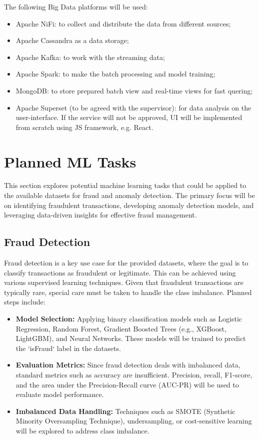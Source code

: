 \documentclass[12pt,a4paper, hidelinks]{article}
\begin{document}
The following Big Data platforms will be used:
\begin{itemize}
    \item Apache NiFi: to collect and distribute the data from different sources;
    \item Apache Cassandra as a data storage;
    \item Apache Kafka: to work with the streaming data;
    \item Apache Spark: to make the batch processing and model training;
    \item MongoDB: to store prepared batch view and real-time views for fast quering;
    \item Apache Superset (to be agreed with the supervisor): for data analysis on the user-interface. If the service will not be approved, UI will be implemented from scratch using JS framework, e.g. React.
\end{itemize}

\section{Planned ML Tasks}

This section explores potential machine learning tasks that could be applied to the available datasets for fraud and anomaly detection. The primary focus will be on identifying fraudulent transactions, developing anomaly detection models, and leveraging data-driven insights for effective fraud management. 

\subsection{Fraud Detection}
Fraud detection is a key use case for the provided datasets, where the goal is to classify transactions as fraudulent or legitimate. This can be achieved using various supervised learning techniques. Given that fraudulent transactions are typically rare, special care must be taken to handle the class imbalance. Planned steps include:
\begin{itemize}
    \item \textbf{Model Selection:} Applying binary classification models such as Logistic Regression, Random Forest, Gradient Boosted Trees (e.g., XGBoost, LightGBM), and Neural Networks. These models will be trained to predict the `isFraud` label in the datasets.
    \item \textbf{Evaluation Metrics:} Since fraud detection deals with imbalanced data, standard metrics such as accuracy are insufficient. Precision, recall, F1-score, and the area under the Precision-Recall curve (AUC-PR) will be used to evaluate model performance.
    \item \textbf{Imbalanced Data Handling:} Techniques such as SMOTE (Synthetic Minority Oversampling Technique), undersampling, or cost-sensitive learning will be explored to address class imbalance.
\end{itemize}
\end{document}
